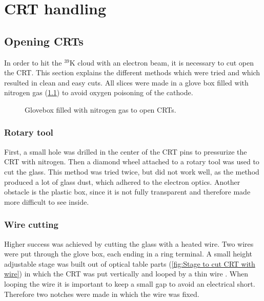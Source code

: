 
\chapter{CRT handling}
\label{chap:CRT handling}

\section{Opening CRTs}
\label{sec:Opening CRTs}

In order to hit the $^{39}\mathrm{K}$ cloud with an electron beam, it is necessary to cut open the CRT. This section explains the different methods which were tried and which resulted in clean and easy cuts. All slices were made in a glove box filled with nitrogen gas (\cref{fig:glovebox}) to avoid oxygen poisoning of the cathode.

\begin{figure}[h]
	
	\caption{Glovebox filled with nitrogen gas to open CRTs.}
	\label{fig:glovebox}
\end{figure}


\subsection{Rotary tool}
\label{subsec:Rotary tool}


First, a small hole was drilled in the center of the CRT pins to pressurize the CRT with nitrogen. Then a diamond wheel attached to a rotary tool was used to cut the glass. This method was tried twice, but did not work well, as the method produced a lot of glass dust, which adhered to the electron optics. Another obstacle is the plastic box, since it is not fully transparent and therefore made more difficult to see inside. 


\subsection{Wire cutting}
\label{subsec:Wire cutting}

Higher success was achieved by cutting the glass with a heated wire. Two wires were put through the glove box, each ending in a ring terminal. A small height adjustable stage was built out of optical table parts (\cref{fig:Stage to cut CRT with wire}) in which the CRT was put vertically and looped by a thin wire . When looping the wire it is important to keep a small gap to avoid an electrical short. Therefore two notches were made in which the wire was fixed.

